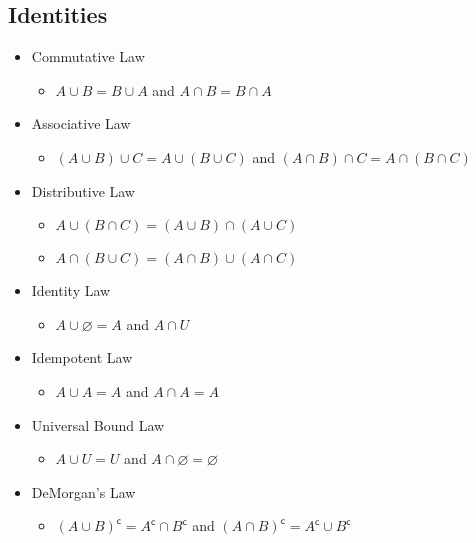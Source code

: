 \documentclass[landscape, letterpaper]{article}
\renewcommand{\complement}[1]{{#1}^\mathsf{c}}
\begin{document}
\begin{multicols}{2}
    \subsection*{Identities}
    \begin{itemize}
        \item Commutative Law
              \begin{itemize}
                  \item $A \cup B = B \cup A $ and $A \cap B = B \cap A$
              \end{itemize}
        \item Associative Law
              \begin{itemize}
                  \item $(A \cup B) \cup C = A \cup (B \cup C)$ and $(A \cap B) \cap C = A \cap (B \cap C)$
              \end{itemize}
        \item Distributive Law
              \begin{itemize}
                  \item $A \cup (B \cap C) = (A \cup B) \cap (A \cup C)$
                  \item $A \cap (B \cup C) = (A \cap B) \cup (A \cap C)$
              \end{itemize}
        \item Identity Law
              \begin{itemize}
                  \item $A \cup \varnothing = A$ and $A \cap U$
              \end{itemize}
        \item Idempotent Law
              \begin{itemize}
                  \item $A \cup A = A$ and $A\cap A = A$
              \end{itemize}
        \item Universal Bound Law
              \begin{itemize}
                  \item $A \cup U = U$ and $A  \cap \varnothing = \varnothing$
              \end{itemize}
        \item DeMorgan's Law
              \begin{itemize}
                  \item $\complement{(A \cup B)} = \complement{A} \cap \complement{B}$ and $\complement{(A \cap B)} = \complement{A} \cup \complement{B}$

\end{itemize}
\end{itemize}
\end{multicols}
\end{document}
